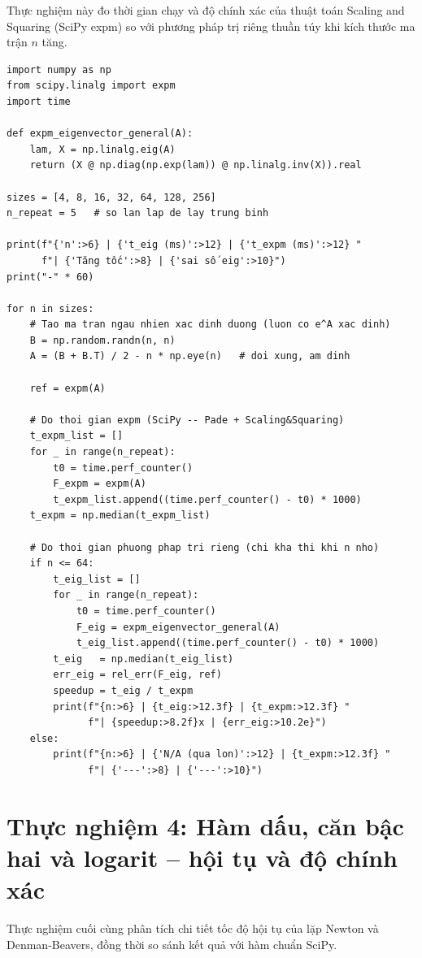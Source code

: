 \documentclass[12pt,a4paper]{report}
\begin{document}
Thực nghiệm này đo thời gian chạy và độ chính xác của thuật toán Scaling and Squaring
(SciPy expm) so với phương pháp trị riêng thuần túy khi kích thước ma trận $n$ tăng.

\begin{lstlisting}[style=python, caption={Thực nghiệm 3: hiệu năng Scaling and Squaring theo kích thước n}]
import numpy as np
from scipy.linalg import expm
import time

def expm_eigenvector_general(A):
    lam, X = np.linalg.eig(A)
    return (X @ np.diag(np.exp(lam)) @ np.linalg.inv(X)).real

sizes = [4, 8, 16, 32, 64, 128, 256]
n_repeat = 5   # so lan lap de lay trung binh

print(f"{'n':>6} | {'t_eig (ms)':>12} | {'t_expm (ms)':>12} "
      f"| {'Tăng tốc':>8} | {'sai số eig':>10}")
print("-" * 60)

for n in sizes:
    # Tao ma tran ngau nhien xac dinh duong (luon co e^A xac dinh)
    B = np.random.randn(n, n)
    A = (B + B.T) / 2 - n * np.eye(n)   # doi xung, am dinh

    ref = expm(A)

    # Do thoi gian expm (SciPy -- Pade + Scaling&Squaring)
    t_expm_list = []
    for _ in range(n_repeat):
        t0 = time.perf_counter()
        F_expm = expm(A)
        t_expm_list.append((time.perf_counter() - t0) * 1000)
    t_expm = np.median(t_expm_list)

    # Do thoi gian phuong phap tri rieng (chi kha thi khi n nho)
    if n <= 64:
        t_eig_list = []
        for _ in range(n_repeat):
            t0 = time.perf_counter()
            F_eig = expm_eigenvector_general(A)
            t_eig_list.append((time.perf_counter() - t0) * 1000)
        t_eig   = np.median(t_eig_list)
        err_eig = rel_err(F_eig, ref)
        speedup = t_eig / t_expm
        print(f"{n:>6} | {t_eig:>12.3f} | {t_expm:>12.3f} "
              f"| {speedup:>8.2f}x | {err_eig:>10.2e}")
    else:
        print(f"{n:>6} | {'N/A (qua lon)':>12} | {t_expm:>12.3f} "
              f"| {'---':>8} | {'---':>10}")
\end{lstlisting}

\section{Thực nghiệm 4: Hàm dấu, căn bậc hai và logarit -- hội tụ và độ chính xác}

Thực nghiệm cuối cùng phân tích chi tiết tốc độ hội tụ của lặp Newton và
Denman-Beavers, đồng thời so sánh kết quả với hàm chuẩn SciPy.
\end{document}
